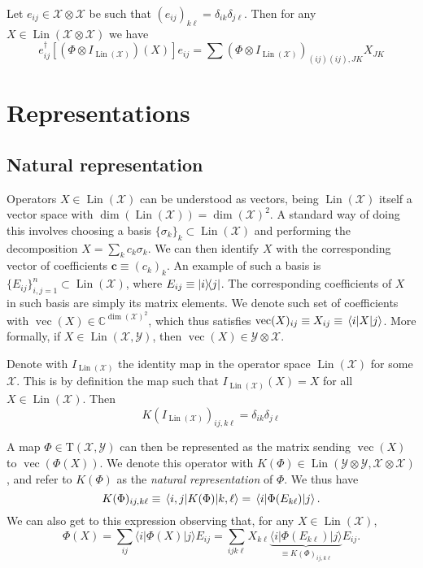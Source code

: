 \documentclass[12pt]{report}
\newcommand{\CC}{\mathbb{C}}
\newcommand{\on}[1]{\operatorname{#1}}
\newcommand{\bs}[1]{\boldsymbol{#1}}
\newcommand{\calY}{{\mathcal{Y}}}
\newcommand{\calX}{{\mathcal{X}}}
\newcommand{\rmT}{{\mathrm{T}}}
\DeclareMathOperator{\Lin}{Lin}
\begin{document}
Let $e_{ij}\in \calX\otimes\calX$ be such that $(e_{ij})_{k\ell}=\delta_{ik}\delta_{j\ell}$. Then for any $X\in\Lin(\calX\otimes\calX)$ we have
\begin{equation}
	e_{ij}^\dagger  [(\Phi\otimes I_{\Lin(\calX)})(X)] e_{ij}
	= \sum (\Phi\otimes I_{\Lin(\calX)})_{(ij)(ij),JK} X_{JK}
\end{equation}

\section{Representations}

\subsection{Natural representation}

Operators $X\in\Lin(\calX)$ can be understood as vectors, being $\Lin(\calX)$ itself a vector space with $\dim(\Lin(\calX))=\dim(\calX)^2$. A standard way of doing this involves choosing a basis $\{\sigma_k\}_k\subset\Lin(\calX)$ and performing the decomposition $X=\sum_k c_k\sigma_k$. We can then identify $X$ with the corresponding vector of coefficients $\bs c\equiv (c_k)_k$.
An example of such a basis is $\{E_{ij}\}_{i,j=1}^n\subset\Lin(\calX)$, where $E_{ij}\equiv \ketbra{i}{j}$.
The corresponding coefficients of $X$ in such basis are simply its matrix elements. We denote such set of coefficients with $\on{vec}(X)\in\CC^{\dim(\calX)^2}$, which thus satisfies
	$\on{vec}(X)_{ij} \equiv X_{ij} \equiv \mel{i}{X}{j}$.
More formally, if $X\in\Lin(\calX,\calY)$, then $\on{vec}(X)\in\calY\otimes\calX$.

\begin{example}
	Denote with $I_{\Lin(\calX)}$ the identity map in the operator space $\Lin(\calX)$ for some $\calX$. This is by definition the map such that $I_{\Lin(\calX)}(X)=X$ for all $X\in\Lin(\calX)$.
	Then
	\begin{equation}
		K(I_{\Lin(\calX)})_{ij,k\ell}
		= \delta_{ik}\delta_{j\ell}
	\end{equation}
\end{example}

A map $\Phi\in\rmT(\calX,\calY)$ can then be represented as the matrix sending $\on{vec}(X)$ to $\on{vec}(\Phi(X))$. We denote this operator with $K(\Phi)\in\Lin(\calY\otimes\calY,\calX\otimes\calX)$, and refer to $K(\Phi)$ as the \emph{natural representation} of $\Phi$.
We thus have
\begin{equation}
	K(\Phi)_{ij,k\ell}
	\equiv \mel{i,j}{K(\Phi)}{k,\ell}
	= \mel{i}{\Phi(E_{k\ell})}{j}.
\end{equation}
We can also get to this expression observing that, for any $X\in\Lin(\calX)$,
\begin{equation}
	\Phi(X)
	= \sum_{ij} \langle i|\Phi(X) |j\rangle E_{ij}
	= \sum_{ijk\ell} X_{k\ell}
	\underbrace{\langle i|\Phi(E_{k\ell})|j\rangle}_{\equiv K(\Phi)_{ij,k\ell}} E_{ij}.
\end{equation}
\end{document}
